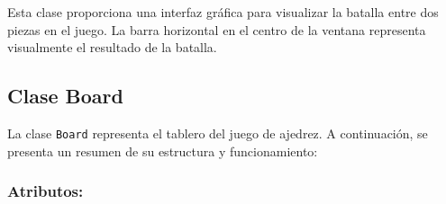 \documentclass{article}
\begin{document}
Esta clase proporciona una interfaz gráfica para visualizar la batalla entre dos piezas en el juego. La barra horizontal en el centro de la ventana representa visualmente el resultado de la batalla.

\subsection{Clase Board}
La clase \texttt{Board} representa el tablero del juego de ajedrez. A continuación, se presenta un resumen de su estructura y funcionamiento:

\subsubsection{Atributos:}
\end{document}
